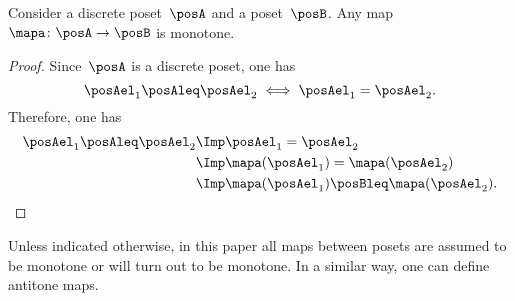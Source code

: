 \begin{lemma}
  Consider a discrete poset~$\posA$ and a poset~$\posB$. Any map~$\mapa \colon \posA\to \posB$ is monotone.
\end{lemma}
\begin{proof}
  Since~$\posA$ is a discrete poset, one has
  \begin{equation}
    \posAel_1\posAleq \posAel_2 \iff \posAel_1=\posAel_2.
  \end{equation}
  Therefore, one has
  \begin{equation}
    \begin{aligned}
      \posAel_1\posAleq \posAel_2 &\Imp \posAel_1=\posAel_2\\
      &\Imp \mapa(\posAel_1)=\mapa(\posAel_2)\\
      &\Imp \mapa(\posAel_1)\posBleq \mapa(\posAel_2).
    \end{aligned}
  \end{equation}
\end{proof}
Unless indicated otherwise, in this paper all maps between posets are assumed to be monotone or will turn out to be monotone. In a similar way, one can define antitone maps.


